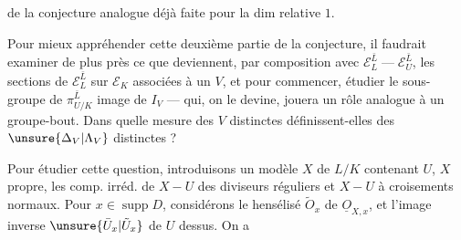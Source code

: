 de la conjecture analogue déjà faite pour la dim relative $1$.

Pour mieux appréhender cette deuxième partie  de la conjecture, il faudrait examiner de plus près ce que deviennent, par composition avec $\mathcal E_L^{\bar L}\mathrel{\text{---}}\mathcal E_U^{\bar L}$, les sections de $\mathcal E_L^{\bar L}$ sur $\mathcal E_K$ associées à un $V$, et pour commencer, étudier le sous-groupe  de $\pi_{U/K}^{\bar L}$ image de $I_V$ --- qui, on le devine, jouera un rôle analogue à un groupe-bout. Dans quelle mesure des $V$ distinctes définissent-elles des $\unsure{\Delta_V|\Lambda_V}$ distinctes ?

Pour étudier cette question, introduisons un modèle $X$ de $L/K$ contenant $U$, $X$ propre, les comp. irréd. de  $X-U$ des diviseurs réguliers  et $X-U$ à croisements normaux. Pour $x\in\operatorname{supp}D$, considérons le hensélisé  $\tilde O_x$ de $\underline{O}_{X,x}$, et l'image inverse $\unsure{\bar U_x|\tilde U_x}$ de $U$ dessus. On a
